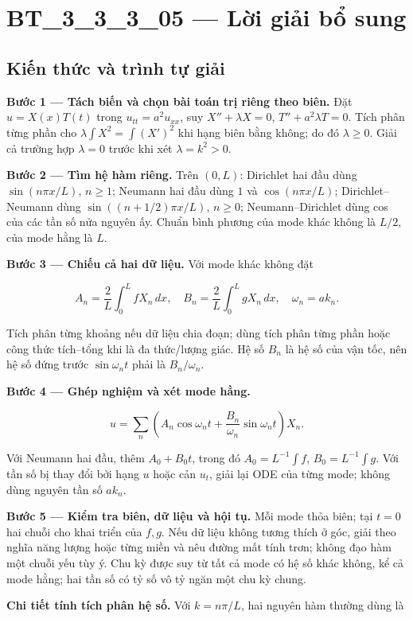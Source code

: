 \documentclass[10pt,a4paper]{article}
\begin{document}
\section*{BT\_3\_3\_3\_05 — Lời giải bổ sung}
\subsection*{Kiến thức và trình tự giải}
\textbf{Bước 1 — Tách biến và chọn bài toán trị riêng theo biên.} Đặt $u=X(x)T(t)$ trong $u_{tt}=a^2u_{xx}$, suy $X''+\lambda X=0$, $T''+a^2\lambda T=0$. Tích phân từng phần cho $\lambda\int X^2=\int (X')^2$ khi hạng biên bằng không; do đó $\lambda\ge0$. Giải cả trường hợp $\lambda=0$ trước khi xét $\lambda=k^2>0$.

\textbf{Bước 2 — Tìm hệ hàm riêng.} Trên $(0,L)$: Dirichlet hai đầu dùng $\sin(n\pi x/L)$, $n\ge1$; Neumann hai đầu dùng $1$ và $\cos(n\pi x/L)$; Dirichlet–Neumann dùng $\sin((n+1/2)\pi x/L)$, $n\ge0$; Neumann–Dirichlet dùng cos của các tần số nửa nguyên ấy. Chuẩn bình phương của mode khác không là $L/2$, của mode hằng là $L$.

\textbf{Bước 3 — Chiếu cả hai dữ liệu.} Với mode khác không đặt


\[
A_n=\frac2L\int_0^L fX_n\,dx,\quad B_n=\frac2L\int_0^L gX_n\,dx,\quad \omega_n=ak_n.
\]


Tích phân từng khoảng nếu dữ liệu chia đoạn; dùng tích phân từng phần hoặc công thức tích–tổng khi là đa thức/lượng giác. Hệ số $B_n$ là hệ số của vận tốc, nên hệ số đứng trước $\sin\omega_nt$ phải là $B_n/\omega_n$.

\textbf{Bước 4 — Ghép nghiệm và xét mode hằng.}


\[
u=\sum_n\left(A_n\cos\omega_nt+\frac{B_n}{\omega_n}\sin\omega_nt\right)X_n.
\]


Với Neumann hai đầu, thêm $A_0+B_0t$, trong đó $A_0=L^{-1}\int f$, $B_0=L^{-1}\int g$. Với tần số bị thay đổi bởi hạng $u$ hoặc cản $u_t$, giải lại ODE của từng mode; không dùng nguyên tần số $ak_n$.

\textbf{Bước 5 — Kiểm tra biên, dữ liệu và hội tụ.} Mỗi mode thỏa biên; tại $t=0$ hai chuỗi cho khai triển của $f,g$. Nếu dữ liệu không tương thích ở góc, giải theo nghĩa năng lượng hoặc từng miền và nêu đường mất tính trơn; không đạo hàm một chuỗi yếu tùy ý. Chu kỳ được suy từ tất cả mode có hệ số khác không, kể cả mode hằng; hai tần số có tỷ số vô tỷ ngăn một chu kỳ chung.

\textbf{Chi tiết tính tích phân hệ số.} Với $k=n\pi/L$, hai nguyên hàm thường dùng là
\end{document}
